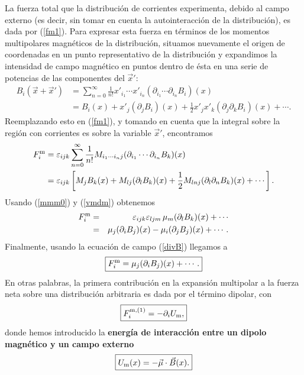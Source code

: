 La fuerza total que la distribución de corrientes experimenta, debido al campo
externo (es decir, sin tomar en cuenta la autointeracción de la distribución),
es dada por (\ref{fm1}). Para expresar esta fuerza en términos de los momentos multipolares magnéticos de la distribución, situamos nuevamente el
origen de coordenadas en un punto representativo de la distribución y expandimos la
intensidad de campo magnético en puntos dentro de ésta en una serie
de potencias de las componentes del $\vec{x}'$:
\begin{align}
 B_i(\vec{x}+\vec{x}') &= \sum_{n=0}^\infty \frac{1}{n!}x'_{i_1}\cdots x'_{i_n}(\partial_{i_1}\cdots\partial_{i_n}B_i)(x) \label{expB} \\
 &= B_i(x)+x'_j(\partial_jB_i)(x) +
\frac{1}{2}x'_jx'_k(\partial_j\partial_kB_i)(x)+\cdots .
\end{align}
Reemplazando esto en (\ref{fm1}), y tomando en cuenta que la integral sobre la región con corrientes es sobre la variable $\vec{x}'$, encontramos
\begin{align}
F^{\rm m}_i &=  \varepsilon_{ijk}\sum_{n=0}^\infty\frac{1}{n!}M_{i_1\cdots i_nj}(\partial_{i_1}\cdots\partial_{i_n}B_k)(x)\\
&= \varepsilon_{ijk}\left[M_jB_k(x)+M_{lj}(\partial_lB_k)(x)+\frac{1}{2}M_{lnj}(\partial_l\partial_nB_k)(x) +\cdots\right].
\end{align}
Usando (\ref{mmm0}) y (\ref{vmdm}) obtenemos
\begin{eqnarray}
F^{\rm m}_i
&=&\varepsilon_{ijk}\varepsilon_{ljm}\,\mu_m (\partial_lB_k)(x)+\cdots \\
&=& \mu_j(\partial_iB_j)(x)-\mu_i(\partial_jB_j)(x)+\cdots .
\end{eqnarray}
Finalmente, usando la ecuación de campo (\ref{divB}) llegamos a
\begin{equation}
 \boxed{F^{\rm m}_i=\mu_j(\partial_iB_j)(x)+\cdots .}
\end{equation}
En otras palabras, la primera contribución en la expansión multipolar a la
fuerza neta sobre una distribución arbitraria es dada por el término dipolar,
con
\begin{equation}
 \boxed{F_i^{\rm m,(1)}=-\partial_i U_{\rm m}, }
\end{equation}
donde hemos introducido la \textbf{energía de interacción entre un dipolo magnético
y un campo externo}
\begin{equation}
 \boxed{U_{\rm m}(x)=-\vec{\mu}\cdot\vec{B}(x).} \label{Umagdip}
\end{equation}

